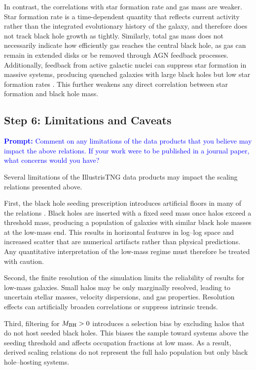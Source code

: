 \documentclass[twocolumn]{aastex631}
\begin{document}
In contrast, the correlations with star formation rate and gas mass are weaker. Star formation rate is a time-dependent quantity that reflects current activity rather than the integrated evolutionary history of the galaxy, and therefore does not track black hole growth as tightly. Similarly, total gas mass does not necessarily indicate how efficiently gas reaches the central black hole, as gas can remain in extended disks or be removed through AGN feedback processes. Additionally, feedback from active galactic nuclei can suppress star formation in massive systems, producing quenched galaxies with large black holes but low star formation rates \citep{HeckmanBest2014}. This further weakens any direct correlation between star formation and black hole mass.

\subsection{Step 6: Limitations and Caveats}
\textcolor{blue}{\textbf{Prompt:} Comment on any limitations of the data products that you believe may impact the above
relations. If your work were to be published in a journal paper, what concerns would you have?}

Several limitations of the IllustrisTNG data products may impact the scaling relations presented above.

First, the black hole seeding prescription introduces artificial floors in many of the relations \citep{Weinberger2017TNG_BHFB}. Black holes are inserted with a fixed seed mass once halos exceed a threshold mass, producing a population of galaxies with similar black hole masses at the low-mass end. This results in horizontal features in log--log space and increased scatter that are numerical artifacts rather than physical predictions. Any quantitative interpretation of the low-mass regime must therefore be treated with caution.

Second, the finite resolution of the simulation limits the reliability of results for low-mass galaxies. Small halos may be only marginally resolved, leading to uncertain stellar masses, velocity dispersions, and gas properties. Resolution effects can artificially broaden correlations or suppress intrinsic trends.

Third, filtering for $M_{\rm BH} > 0$ introduces a selection bias by excluding halos that do not host seeded black holes. This biases the sample toward systems above the seeding threshold and affects occupation fractions at low mass. As a result, derived scaling relations do not represent the full halo population but only black hole--hosting systems.
\end{document}
